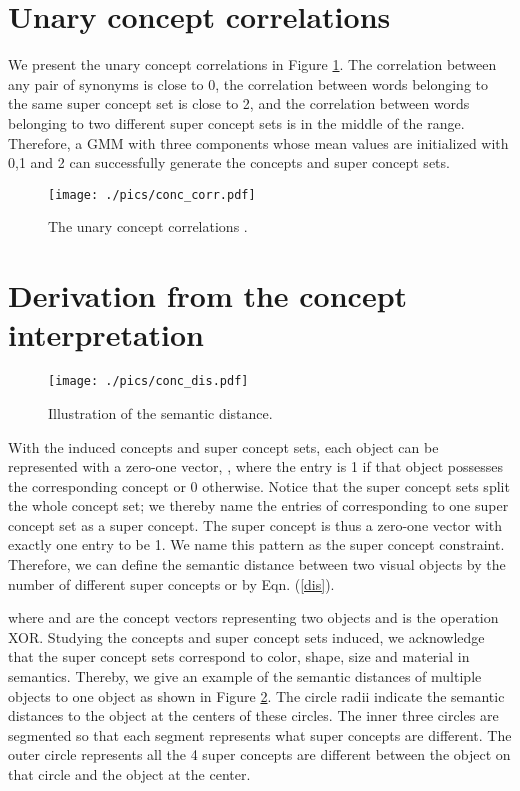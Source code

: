 \documentclass[final]{cvpr}
\begin{document}
{\small


}

\appendix
\clearpage

\section{Unary concept correlations }
\label{app:concept_correlation}

We present the unary concept correlations  in Figure \ref{conc_corr}. 
The correlation between any pair of synonyms is close to 0, the correlation between words belonging to the same super concept set is close to 2, and the correlation between words belonging to two different super concept sets is in the middle of the range. Therefore, a GMM with three components whose mean values are initialized with 0,1 and 2 can successfully generate the concepts and super concept sets. 

\begin{figure}[h]
\centering
\texttt{[image: ./pics/conc\_corr.pdf]}
\caption{The unary concept correlations .}
\label{conc_corr}
\vspace{-1mm}
\end{figure}

\section{Derivation from the concept interpretation}
\label{app:concept_dis}

\label{app:visualization}
\begin{figure}[h]
\centering
\texttt{[image: ./pics/conc\_dis.pdf]}
\caption{Illustration of the semantic distance.}
\label{conc_dis}
\end{figure}

With the induced concepts and super concept sets, each object can be represented with a zero-one vector, , where the entry is 1 if that object possesses the corresponding concept or 0 otherwise. Notice that the super concept sets split the whole concept set; we thereby name the entries of  corresponding to one super concept set as a super concept. The super concept is thus a zero-one vector with exactly one entry to be 1. We name this pattern as the super concept constraint. Therefore, we can define the semantic distance between two visual objects by the number of different super concepts or by Eqn. (\ref{dis}). 

where  and  are the concept vectors representing two objects and  is the operation XOR. Studying the concepts and super concept sets induced, we acknowledge that the super concept sets correspond to color, shape, size and material in semantics. Thereby, we give an example of the semantic distances of multiple objects to one object as shown in Figure \ref{conc_dis}. The circle radii indicate the semantic distances to the object at the centers of these circles. The inner three circles are segmented so that each segment represents what super concepts are different. The outer circle represents all the 4 super concepts are different between the object on that circle and the object at the center.
\end{document}

